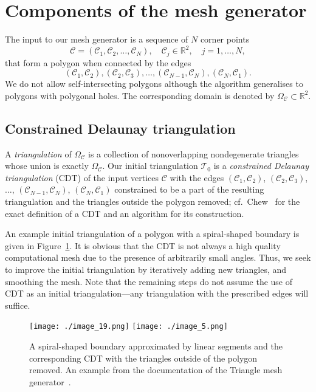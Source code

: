 \documentclass[12pt]{rmstyle}
\begin{document}
\section{Components of the mesh generator}
\label{sec:components}

The input to
our mesh generator is a sequence of \(N\) corner points
$$\mathcal{C} = (\mathcal{C}_1, \mathcal{C}_2, \dots, \mathcal{C}_N), \quad \mathcal{C}_j \in \mathbb{R}^2, \quad j = 1,\dots,N,$$
that form a polygon when connected by the edges
$$(\mathcal{C}_1, \mathcal{C}_2), (\mathcal{C}_2,\mathcal{C}_3),
\dots, (\mathcal{C}_{N-1}, \mathcal{C}_N), (\mathcal{C}_N,\mathcal{C}_1).$$
We do not allow self-intersecting polygons although
the algorithm generalises to polygons
with polygonal holes.
The corresponding domain is denoted
by \(\Omega_{\mathcal{C}} \subset \mathbb{R}^2\).

\subsection{Constrained Delaunay triangulation}
\label{sec:cdt}

A \emph{triangulation} of \(\Omega_{\mathcal{C}}\) is a
collection of nonoverlapping nondegenerate triangles whose union is exactly
\(\Omega_{\mathcal{C}}\).  Our initial triangulation \(\mathcal{T}_0\) is a
\emph{constrained Delaunay triangulation} (CDT) of the input vertices
\(\mathcal{C}\) with the edges \((\mathcal{C}_1, \mathcal{C}_2)\),
\((\mathcal{C}_2,\mathcal{C}_3)\), \(\dots\), \((\mathcal{C}_{N-1},
\mathcal{C}_N)\), \((\mathcal{C}_N, \mathcal{C}_1)\) constrained to be a part of
the resulting triangulation and the triangles outside the polygon removed;
cf.~Chew~\cite{Chew_1987} for the exact definition of a CDT and an algorithm for
its construction.

An example initial triangulation of a polygon with a spiral-shaped boundary is
given in Figure~\ref{fig:cdt}. It is obvious that the CDT is not always a high
quality computational mesh due to the presence of arbitrarily small angles.
Thus, we seek to improve the initial triangulation by iteratively adding new
triangles, and smoothing the mesh.  Note that the remaining steps do not assume
the use of CDT as an initial triangulation---any triangulation with the
prescribed edges will suffice.

\begin{figure}[htbp]
  \centering
  \texttt{[image: ./image\_19.png]}
  \texttt{[image: ./image\_5.png]}
\caption{A spiral-shaped boundary approximated by linear segments and the
  corresponding CDT with the triangles outside of the polygon removed.  An
  example from the documentation of the Triangle mesh
  generator~\cite{shewchuk1996triangle}.}
\label{fig:cdt}
\end{figure}
\end{document}
